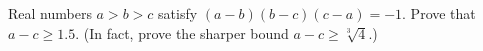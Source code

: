 Real numbers $a>b>c$ satisfy $(a-b)(b-c)(c-a)=-1$. Prove that $a-c\ge1.5$. (In fact, prove the sharper bound $a-c\ge\sqrt[3]{4}$.)

